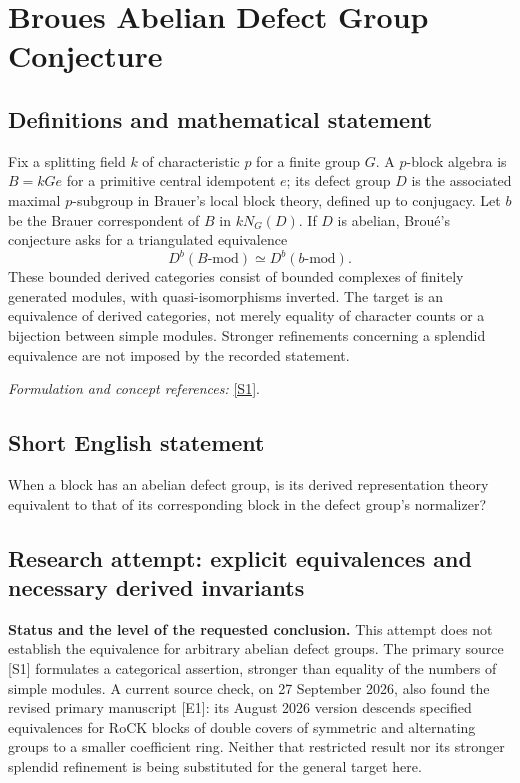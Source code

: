 \documentclass[11pt]{article}
\begin{document}
\section*{\texorpdfstring{Broues Abelian Defect Group Conjecture}{Broues Abelian Defect Group Conjecture}}\label{337}
\subsection{Definitions and mathematical statement}
Fix a splitting field $k$ of characteristic $p$ for a finite group $G$. A $p$-block algebra is $B=kGe$ for a primitive central idempotent $e$; its defect group $D$ is the associated maximal $p$-subgroup in Brauer's local block theory, defined up to conjugacy. Let $b$ be the Brauer correspondent of $B$ in $kN_G(D)$. If $D$ is abelian, Brou\'e's conjecture asks for a triangulated equivalence
\[
 D^b(B\text{-}\mathrm{mod})\simeq D^b(b\text{-}\mathrm{mod}).
\]
These bounded derived categories consist of bounded complexes of finitely generated modules, with quasi-isomorphisms inverted. The target is an equivalence of derived categories, not merely equality of character counts or a bijection between simple modules. Stronger refinements concerning a splendid equivalence are not imposed by the recorded statement.
\par\smallskip\textit{Formulation and concept references:} \href{http://www.numdam.org/item/AST_1990__181-182__61_0/}{[S1]}.

\subsection{Short English statement}
When a block has an abelian defect group, is its derived representation theory equivalent to that of its corresponding block in the defect group's normalizer?
\subsection{Research attempt: explicit equivalences and necessary derived invariants}
\textbf{Status and the level of the requested conclusion.} This attempt does not establish the equivalence for arbitrary abelian defect groups. The primary source [S1] formulates a categorical assertion, stronger than equality of the numbers of simple modules. A current source check, on 27 September 2026, also found the revised primary manuscript [E1]: its August 2026 version descends specified equivalences for RoCK blocks of double covers of symmetric and alternating groups to a smaller coefficient ring. Neither that restricted result nor its stronger splendid refinement is being substituted for the general target here.
\end{document}
